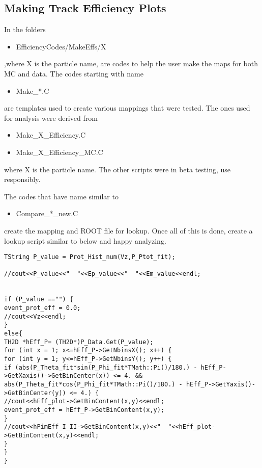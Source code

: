 \documentclass[11pt,a4paper]{article}
\begin{document}
\subsection{Making Track Efficiency Plots}
In the folders
\begin{itemize}
	\item EfficiencyCodes/MakeEffs/X
\end{itemize} 
,where X is the particle name, are codes to help the user make the maps for both MC and data.
The codes starting with name
\begin{itemize}
	\item Make\_*.C
\end{itemize}
are templates used to create various mappings that were tested.
The ones used for analysis were derived from 
\begin{itemize}
	\item Make\_X\_Efficiency.C
	\item Make\_X\_Efficiency\_MC.C
\end{itemize}
where X is the particle name. The other scripts were in beta testing, use responsibly.

The codes that have name similar to 
\begin{itemize}
	\item Compare\_*\_new.C
\end{itemize}
create the mapping and ROOT file for lookup.
Once all of this is done, create a lookup script similar to below and happy analyzing.
\begin{lstlisting}
TString P_value = Prot_Hist_num(Vz,P_Ptot_fit);

//cout<<P_value<<"  "<<Ep_value<<"  "<<Em_value<<endl;


if (P_value =="") {
event_prot_eff = 0.0;
//cout<<Vz<<endl;
}
else{
TH2D *hEff_P= (TH2D*)P_Data.Get(P_value);
for (int x = 1; x<=hEff_P->GetNbinsX(); x++) {
for (int y = 1; y<=hEff_P->GetNbinsY(); y++) {
if (abs(P_Theta_fit*sin(P_Phi_fit*TMath::Pi()/180.) - hEff_P->GetXaxis()->GetBinCenter(x)) <= 4. && abs(P_Theta_fit*cos(P_Phi_fit*TMath::Pi()/180.) - hEff_P->GetYaxis()->GetBinCenter(y)) <= 4.) {
//cout<<hEff_plot->GetBinContent(x,y)<<endl;
event_prot_eff = hEff_P->GetBinContent(x,y);
}
//cout<<hPimEff_I_II->GetBinContent(x,y)<<"  "<<hEff_plot->GetBinContent(x,y)<<endl;
}
}
}
\end{lstlisting}
       
       
       
\end{document}
